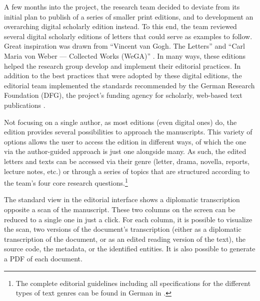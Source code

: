 \begin{paper}
A few months into the project, the research team decided to deviate from its initial plan to publish of a series of smaller print editions, and to 
development an overarching digital scholarly
edition instead. To this end, the team reviewed several digital scholarly
editions of letters that could serve as examples to follow. Great
inspiration was drawn  from ``Vincent van Gogh. The
Letters'' \citep{van_gogh_vincent_2009} and ``Carl Maria von Weber --- Collected Works
(WeGA)'' \citep{von_weber_carl-maria-von-weber-gesamtausgabe_2017}. In many ways, these editions helped the research group develop and implement their editorial practices. In addition to the best practices that were adopted by these digital editions, the editorial team
implemented the standards recommended by the German Research Foundation
(DFG), the project's funding agency for scholarly, web-based text
publications \citep{dfg_informationen_2015}.

Not focusing on a single author, as most editions
(even digital ones) do, the edition provides several possibilities
to approach the manuscripts. This variety of options allows the user to access
the edition in different ways, of which the one via the author-guided approach is just one alongside many. As such, the edited letters and
texts can be accessed via their genre (letter, drama, novella,
reports, lecture notes, etc.) or through a series of topics that are structured according
to the team's four core research questions.\footnote{The
  complete editorial guidelines including all specifications for the
  different types of text genres can be found in German in \citealt{baillot_berliner_2010}.}

The standard view in the editorial interface shows a diplomatic transcription opposite a scan of
the manuscript. These two columns on the screen can be
reduced to a single one in just a click. For each column, it is possible to
visualize the scan, two versions of the document's transcription (either as a diplomatic transcription of the document, or as an edited reading version of the
text), the source code, the metadata, or the identified
entities. It is also possible to generate a PDF of each document.


\end{paper}
